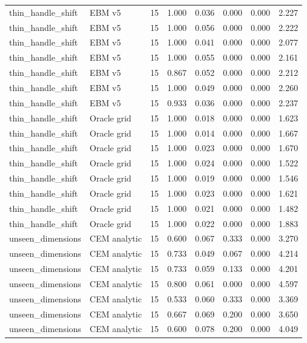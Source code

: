 {\begin{longtable}{llrrrrrr}
thin\_handle\_shift & EBM v5 & 15 & 1.000 & 0.036 & 0.000 & 0.000 & 2.227 \\
thin\_handle\_shift & EBM v5 & 15 & 1.000 & 0.056 & 0.000 & 0.000 & 2.222 \\
thin\_handle\_shift & EBM v5 & 15 & 1.000 & 0.041 & 0.000 & 0.000 & 2.077 \\
thin\_handle\_shift & EBM v5 & 15 & 1.000 & 0.055 & 0.000 & 0.000 & 2.161 \\
thin\_handle\_shift & EBM v5 & 15 & 0.867 & 0.052 & 0.000 & 0.000 & 2.212 \\
thin\_handle\_shift & EBM v5 & 15 & 1.000 & 0.049 & 0.000 & 0.000 & 2.260 \\
thin\_handle\_shift & EBM v5 & 15 & 0.933 & 0.036 & 0.000 & 0.000 & 2.237 \\
thin\_handle\_shift & Oracle grid & 15 & 1.000 & 0.018 & 0.000 & 0.000 & 1.623 \\
thin\_handle\_shift & Oracle grid & 15 & 1.000 & 0.014 & 0.000 & 0.000 & 1.667 \\
thin\_handle\_shift & Oracle grid & 15 & 1.000 & 0.023 & 0.000 & 0.000 & 1.670 \\
thin\_handle\_shift & Oracle grid & 15 & 1.000 & 0.024 & 0.000 & 0.000 & 1.522 \\
thin\_handle\_shift & Oracle grid & 15 & 1.000 & 0.019 & 0.000 & 0.000 & 1.546 \\
thin\_handle\_shift & Oracle grid & 15 & 1.000 & 0.023 & 0.000 & 0.000 & 1.621 \\
thin\_handle\_shift & Oracle grid & 15 & 1.000 & 0.021 & 0.000 & 0.000 & 1.482 \\
thin\_handle\_shift & Oracle grid & 15 & 1.000 & 0.022 & 0.000 & 0.000 & 1.883 \\
unseen\_dimensions & CEM analytic & 15 & 0.600 & 0.067 & 0.333 & 0.000 & 3.270 \\
unseen\_dimensions & CEM analytic & 15 & 0.733 & 0.049 & 0.067 & 0.000 & 4.214 \\
unseen\_dimensions & CEM analytic & 15 & 0.733 & 0.059 & 0.133 & 0.000 & 4.201 \\
unseen\_dimensions & CEM analytic & 15 & 0.800 & 0.061 & 0.000 & 0.000 & 4.597 \\
unseen\_dimensions & CEM analytic & 15 & 0.533 & 0.060 & 0.333 & 0.000 & 3.369 \\
unseen\_dimensions & CEM analytic & 15 & 0.667 & 0.069 & 0.200 & 0.000 & 3.650 \\
unseen\_dimensions & CEM analytic & 15 & 0.600 & 0.078 & 0.200 & 0.000 & 4.049 \\

\end{longtable}}
